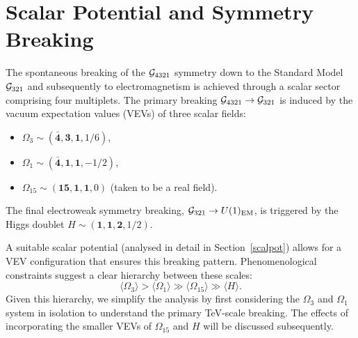 \section{Scalar Potential and Symmetry Breaking}

The spontaneous breaking of the $\mathcal{G}_{\rm 4321}$ symmetry down to the Standard Model $\mathcal{G}_{\rm 321}$ and subsequently to electromagnetism is achieved through a scalar sector comprising four multiplets. The primary breaking $\mathcal{G}_{\rm 4321} \to \mathcal{G}_{\rm 321}$ is induced by the vacuum expectation values (VEVs) of three scalar fields:
\begin{itemize}
    \item $\Omega_3 \sim \left( \mathbf{\bar 4}, \mathbf{3}, \mathbf{1}, 1/6 \right)$,
    \item $\Omega_1 \sim \left( \mathbf{\bar 4}, \mathbf{1}, \mathbf{1}, -1/2 \right)$,
    \item $\Omega_{15} \sim \left( \mathbf{15}, \mathbf{1}, \mathbf{1}, 0 \right)$ (taken to be a real field).
\end{itemize}
The final electroweak symmetry breaking, $\mathcal{G}_{\rm 321} \to U(1)_{\rm EM}$, is triggered by the Higgs doublet $H \sim (\mathbf{1},\mathbf{1},\mathbf{2},1/2)$.

A suitable scalar potential (analysed in detail in Section~\ref{scalpot}) allows for a VEV configuration that ensures this breaking pattern. Phenomenological constraints suggest a clear hierarchy between these scales:
\begin{equation}
    \langle \Omega_{3} \rangle > \langle \Omega_{1} \rangle \gg \langle \Omega_{15} \rangle \gg \langle H \rangle.
\end{equation}
Given this hierarchy, we simplify the analysis by first considering the $\Omega_{3}$ and $\Omega_{1}$ system in isolation to understand the primary TeV-scale breaking. The effects of incorporating the smaller VEVs of $\Omega_{15}$ and $H$ will be discussed subsequently.


